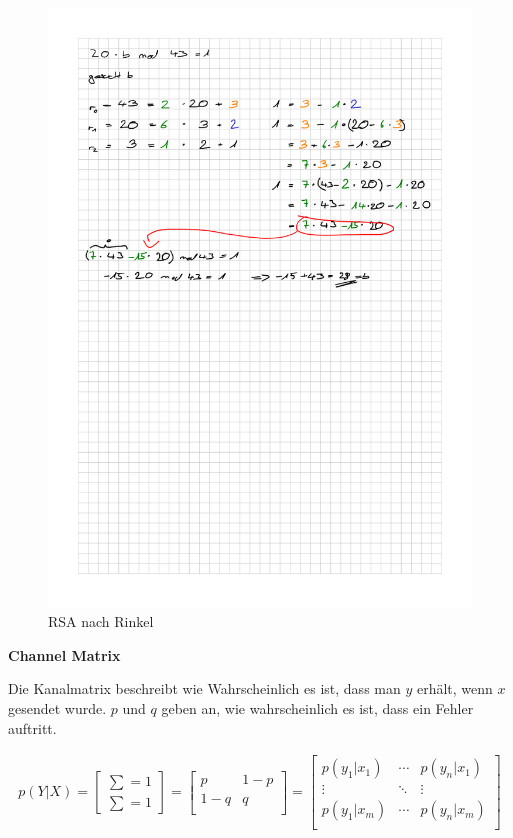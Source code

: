 \documentclass[11pt,twoside,twocolumn,landscape]{article}
\begin{document}
\begin{figure}[htbp]
\centering
\includegraphics[width=.9\linewidth]{img/rsa_nach_rinkel.png}
\caption{\label{fig:orge01264f}RSA nach Rinkel}
\end{figure}

\textbf{Channel Matrix}

Die Kanalmatrix beschreibt wie Wahrscheinlich es ist, dass man \(y\) erhält, wenn \(x\) gesendet wurde.
\(p\) und \(q\) geben an, wie wahrscheinlich es ist, dass ein Fehler auftritt.

\begin{align}
  p(Y|X) =
  \begin{bmatrix}
    \sum = 1 \\
    \sum = 1
  \end{bmatrix}
=
  \begin{bmatrix}
    p & 1 - p \\
    1 - q & q \\
  \end{bmatrix}
=
  \begin{bmatrix}
    p(y_1|x_1) & \cdots & p(y_n|x_1) \\
    \vdots & \ddots & \vdots \\
    p(y_1|x_m) & \cdots & p(y_n|x_m) \\
  \end{bmatrix}
\end{align}
\end{document}
